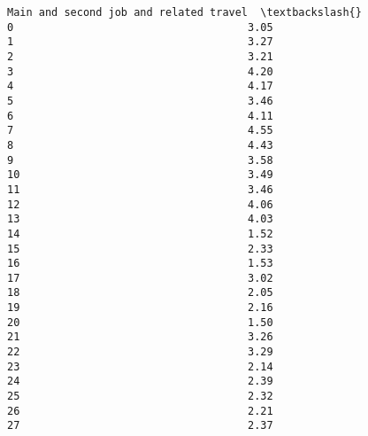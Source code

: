 \documentclass[11pt]{article}
\begin{document}
\begin{Verbatim}[commandchars=\\\{\}]
    Main and second job and related travel  \textbackslash{}
0                                     3.05   
1                                     3.27   
2                                     3.21   
3                                     4.20   
4                                     4.17   
5                                     3.46   
6                                     4.11   
7                                     4.55   
8                                     4.43   
9                                     3.58   
10                                    3.49   
11                                    3.46   
12                                    4.06   
13                                    4.03   
14                                    1.52   
15                                    2.33   
16                                    1.53   
17                                    3.02   
18                                    2.05   
19                                    2.16   
20                                    1.50   
21                                    3.26   
22                                    3.29   
23                                    2.14   
24                                    2.39   
25                                    2.32   
26                                    2.21   
27                                    2.37   


\end{Verbatim}
\end{document}
